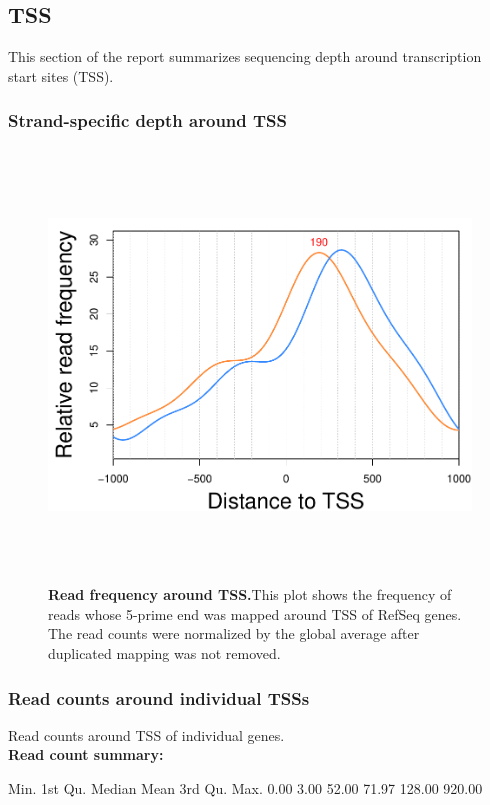 \documentclass{article}
\begin{document}
\subsection{TSS}
This section of the report summarizes sequencing depth around transcription start sites (TSS).
\subsubsection{Strand-specific depth around TSS}
\begin{center}
\begin{figure}[H]
\includegraphics[width=6.5in, height=4.5in, page=1]{bamchop-chip-tss-loc}
\caption{\textbf{Read frequency around TSS.}This plot shows the frequency of reads whose 5-prime end was mapped around TSS of RefSeq genes. The read counts were normalized by the global average after duplicated mapping was not removed.}
\end{figure}
\end{center}

\subsubsection{Read counts around individual TSSs}
Read counts around TSS of individual genes.
\vspace*{1\baselineskip}
\\{\textbf{Read count summary:}}
\begin{Schunk}
\begin{Soutput}
   Min. 1st Qu.  Median    Mean 3rd Qu.    Max. 
   0.00    3.00   52.00   71.97  128.00  920.00 
\end{Soutput}
\end{Schunk}
\end{document}
